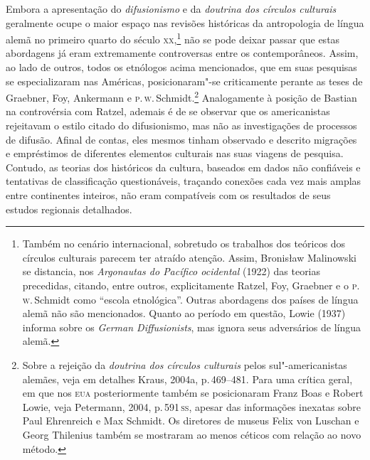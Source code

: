 Embora a apresentação do \textit{difusionismo} e da \textit{doutrina dos círculos
culturais} geralmente ocupe o maior espaço nas revisões históricas da
antropologia de língua alemã no primeiro quarto do século \textsc{xx},\footnote{Também
  no cenário internacional, sobretudo os trabalhos dos teóricos dos
  círculos culturais parecem ter atraído atenção. Assim, Bronisław
  Malinowski se distancia, nos \textit{Argonautas do Pacífico ocidental}
  (1922) das teorias precedidas, citando, entre outros, explicitamente
  Ratzel, Foy, Graebner e o \textsc{p}.\,\textsc{w}.\,Schmidt como ``escola etnológica''.
  Outras abordagens dos países de língua alemã não são mencionados.
  Quanto ao período em questão, Lowie (1937) informa sobre os
  \textit{German Diffusionists}, mas ignora seus adversários de língua
  alemã.} não se pode deixar passar que estas abordagens já eram
extremamente controversas entre os contemporâneos. Assim, ao lado de
outros, todos os etnólogos acima mencionados, que em suas pesquisas se
especializaram nas Américas, posicionaram"-se criticamente perante as
teses de Graebner, Foy, Ankermann e \textsc{p}.\,\textsc{w}.\,Schmidt.\footnote{Sobre a
  rejeição da \textit{doutrina dos círculos culturais} pelos
  sul"-americanistas alemães, veja em detalhes Kraus, 2004a, p.\,469--481.
  Para uma crítica geral, em que nos \textsc{eua} posteriormente também
  se posicionaram Franz Boas e Robert Lowie, veja Petermann, 2004, p.\,591\,\textsc{ss}, apesar das informações inexatas sobre Paul Ehrenreich e Max
  Schmidt. Os diretores de museus Felix von Luschan e Georg
  Thilenius também se mostraram ao menos céticos com relação
  ao novo método.} Analogamente à posição de Bastian na controvérsia com
Ratzel, ademais é de se observar que os americanistas rejeitavam o
estilo citado do difusionismo, mas não as investigações de processos de
difusão. Afinal de contas, eles mesmos tinham observado e descrito
migrações e empréstimos de diferentes elementos culturais nas suas
viagens de pesquisa. Contudo, as teorias dos históricos da cultura,
baseados em dados não confiáveis e tentativas de classificação
questionáveis, traçando conexões cada vez mais amplas entre continentes
inteiros, não eram compatíveis com os resultados de seus estudos
regionais detalhados.

